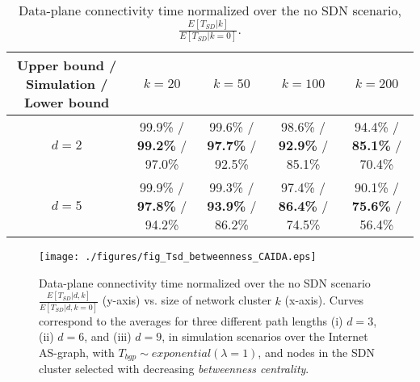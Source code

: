 \begin{table*}
\centering
\caption{Data-plane connectivity time normalized over the no SDN scenario, $\frac{E[T_{SD}|k]}{E[T_{SD}|k=0]}$.}
\label{table:bounds}
\begin{tabular}{|c|cccc|}
\hline
{Upper bound / \textbf{Simulation} / Lower bound}		& {$k=20$}								& {$k=50$}		& {$k=100$}		& {$k=200$}\\
\hline
{$d=2$}				& {99.9\% / \textbf{99.2\%} / 97.0\%}	& {99.6\% / \textbf{97.7\%} / 92.5\%}	& {98.6\% / \textbf{92.9\%} / 85.1\%}	& {94.4\% / \textbf{85.1\%} / 70.4\%}	\\
{$d=5$}				& {99.9\% / \textbf{97.8\%} / 94.2\%}	& {99.3\% / \textbf{93.9\%} / 86.2\%}	& {97.4\% / \textbf{86.4\%} / 74.5\%}	& {90.1\% / \textbf{75.6\%} / 56.4\%}	\\
\hline
\end{tabular}
\end{table*}




\begin{figure}
\centering
\texttt{[image: ./figures/fig\_Tsd\_betweenness\_CAIDA.eps]}
\caption{Data-plane connectivity time normalized over the no SDN scenario $\frac{E[T_{SD}|d,k]}{E[T_{SD}|d,k=0]}$ (y-axis) vs. size of network cluster $k$ (x-axis). Curves correspond to the averages for three different path lengths (i) $d=3$, (ii) $d=6$, and (iii) $d=9$, in simulation scenarios over the Internet AS-graph, with $T_{bgp}\sim exponential(\lambda=1)$, and nodes in the SDN cluster selected with decreasing \textit{betweenness centrality}.}
\label{fig:t-sd-betweenness-caida}
\end{figure}
